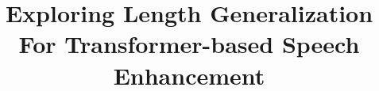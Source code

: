 \documentclass[journal]{IEEEtran}
\begin{document}
%
\title{Exploring Length Generalization For Transformer-based Speech Enhancement}
%
%
%
\end{document}
